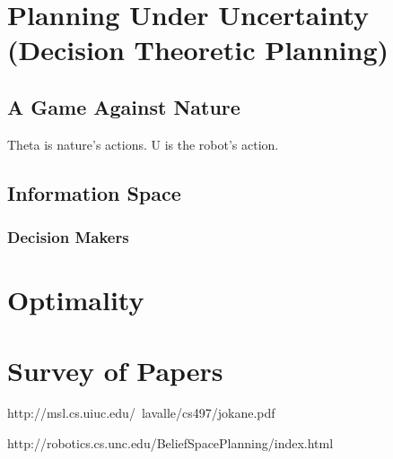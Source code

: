 \section{Planning Under Uncertainty (Decision Theoretic Planning)}

\subsection{A Game Against Nature}

Theta is nature's actions. U is the robot's action.

\subsection{Information Space}
\subsubsection{Decision Makers}

\section{Optimality}


\section{Survey of Papers}

http://msl.cs.uiuc.edu/~lavalle/cs497/jokane.pdf

http://robotics.cs.unc.edu/BeliefSpacePlanning/index.html